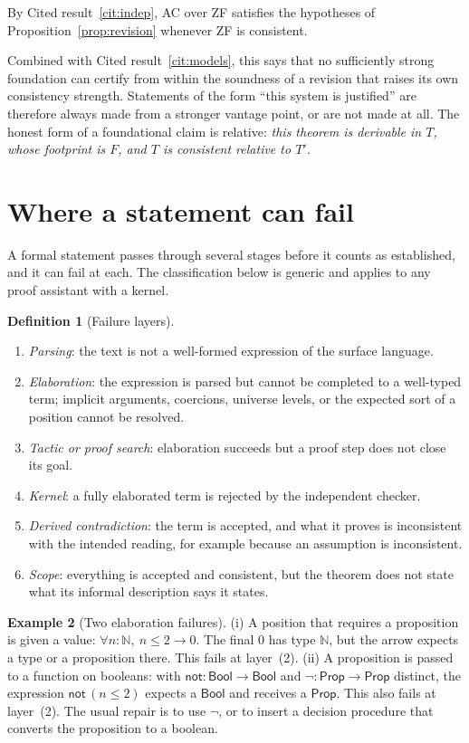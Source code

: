 \documentclass[11pt]{article}
\newcommand{\Prop}{\mathsf{Prop}}
\theoremstyle{definition}
\newtheorem{definition}{Definition}[section]
\newtheorem{example}[definition]{Example}
\theoremstyle{plain}
\theoremstyle{remark}
\begin{document}
By Cited result~\ref{cit:indep}, AC over ZF satisfies the hypotheses of Proposition~\ref{prop:revision} whenever ZF is consistent.

Combined with Cited result~\ref{cit:models}, this says that no sufficiently strong foundation can certify from within the soundness of a revision that raises its own consistency strength. Statements of the form ``this system is justified'' are therefore always made from a stronger vantage point, or are not made at all. The honest form of a foundational claim is relative: \emph{this theorem is derivable in $T$, whose footprint is $F$, and $T$ is consistent relative to $T'$.}

\section{Where a statement can fail}\label{sec:layers}

A formal statement passes through several stages before it counts as established, and it can fail at each. The classification below is generic and applies to any proof assistant with a kernel.

\begin{definition}[Failure layers]\label{def:layers}
\begin{enumerate}[label=(\arabic*)]
\item \emph{Parsing}: the text is not a well-formed expression of the surface language.
\item \emph{Elaboration}: the expression is parsed but cannot be completed to a well-typed term; implicit arguments, coercions, universe levels, or the expected sort of a position cannot be resolved.
\item \emph{Tactic or proof search}: elaboration succeeds but a proof step does not close its goal.
\item \emph{Kernel}: a fully elaborated term is rejected by the independent checker.
\item \emph{Derived contradiction}: the term is accepted, and what it proves is inconsistent with the intended reading, for example because an assumption is inconsistent.
\item \emph{Scope}: everything is accepted and consistent, but the theorem does not state what its informal description says it states.
\end{enumerate}
\end{definition}

\begin{example}[Two elaboration failures]\label{ex:elab}
(i) A position that requires a proposition is given a value: $\forall n:\mathbb{N},\ n\le2\to 0$. The final $0$ has type $\mathbb{N}$, but the arrow expects a type or a proposition there. This fails at layer~(2).
(ii) A proposition is passed to a function on booleans: with $\mathsf{not}:\mathsf{Bool}\to\mathsf{Bool}$ and $\neg:\Prop\to\Prop$ distinct, the expression $\mathsf{not}\,(n\le2)$ expects a $\mathsf{Bool}$ and receives a $\Prop$. This also fails at layer~(2). The usual repair is to use $\neg$, or to insert a decision procedure that converts the proposition to a boolean.
\end{example}
\end{document}
